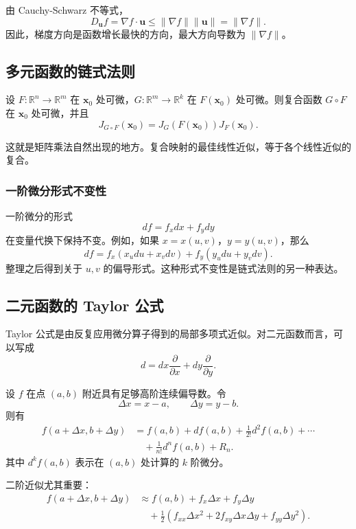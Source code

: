 由 Cauchy-Schwarz 不等式，
\[
    D_{\mathbf{u}}f=\nabla f\cdot\mathbf{u}
    \leq \|\nabla f\|\|\mathbf{u}\|=\|\nabla f\|.
\]
因此，梯度方向是函数增长最快的方向，最大方向导数为 $\|\nabla f\|$。

\subsection{多元函数的链式法则}

\newpage

\begin{theorem}[链式法则]
设 $F:\mathbb{R}^n\to\mathbb{R}^m$ 在 $\mathbf{x}_0$ 处可微，$G:\mathbb{R}^m\to\mathbb{R}^k$ 在 $F(\mathbf{x}_0)$ 处可微。则复合函数 $G\circ F$ 在 $\mathbf{x}_0$ 处可微，并且
\[
    J_{G\circ F}(\mathbf{x}_0)=J_G(F(\mathbf{x}_0))J_F(\mathbf{x}_0).
\]
\end{theorem}

这就是矩阵乘法自然出现的地方。复合映射的最佳线性近似，等于各个线性近似的复合。

\subsubsection{一阶微分形式不变性}

一阶微分的形式
\[
    df=f_xdx+f_ydy
\]
在变量代换下保持不变。例如，如果 $x=x(u,v)$，$y=y(u,v)$，那么
\[
    df=f_x(x_ud u+x_vd v)+f_y(y_ud u+y_vd v).
\]
整理之后得到关于 $u,v$ 的偏导形式。这种形式不变性是链式法则的另一种表达。

\subsection{二元函数的 Taylor 公式}

Taylor 公式是由反复应用微分算子得到的局部多项式近似。对二元函数而言，可以写成
\[
    d=dx\frac{\partial}{\partial x}+dy\frac{\partial}{\partial y}.
\]

\begin{theorem}[Taylor 公式]
设 $f$ 在点 $(a,b)$ 附近具有足够高阶连续偏导数。令
\[
    \Delta x=x-a,
    \qquad
    \Delta y=y-b.
\]
则有
\[
\begin{aligned}
    f(a+\Delta x,b+\Delta y)
    &=f(a,b)+df(a,b)+\frac{1}{2!}d^2f(a,b)+\cdots \\
    &\quad +\frac{1}{n!}d^nf(a,b)+R_n.
\end{aligned}
\]
其中 $d^kf(a,b)$ 表示在 $(a,b)$ 处计算的 $k$ 阶微分。
\end{theorem}

二阶近似尤其重要：
\[
\begin{aligned}
    f(a+\Delta x,b+\Delta y)
    &\approx f(a,b)+f_x\Delta x+f_y\Delta y \\
    &\quad +\frac12\left(f_{xx}\Delta x^2+2f_{xy}\Delta x\Delta y+f_{yy}\Delta y^2\right).
\end{aligned}
\]


